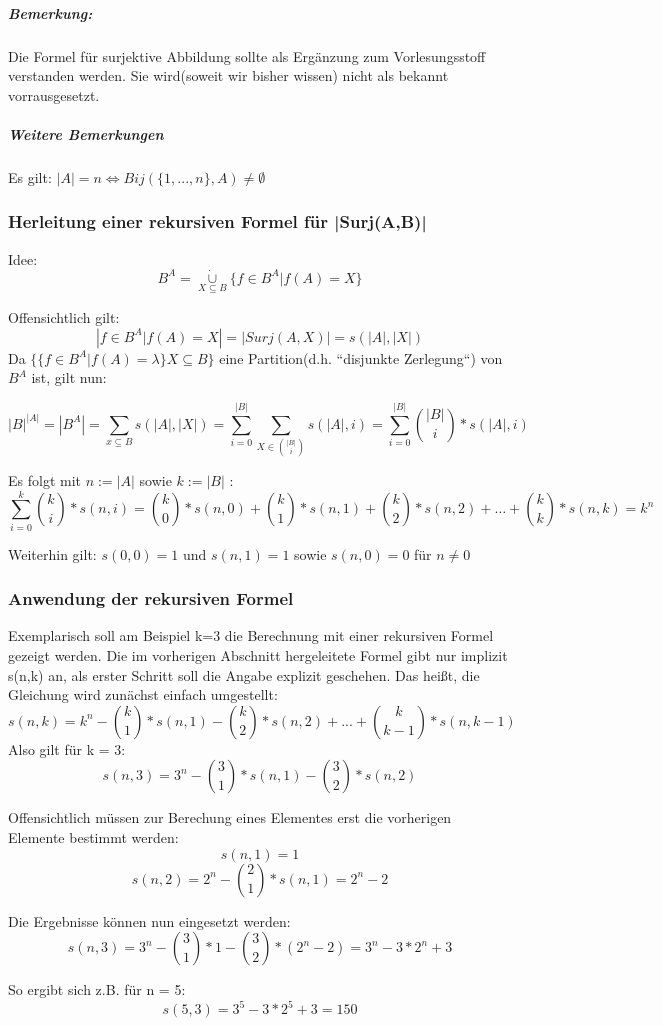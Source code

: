 \subparagraph*{Bemerkung:} Die Formel für surjektive Abbildung sollte als Ergänzung zum Vorlesungsstoff verstanden werden.
Sie wird(soweit wir bisher wissen) nicht als bekannt vorrausgesetzt.

\subparagraph{Weitere Bemerkungen}
Es gilt:
$ |A| = n \Longleftrightarrow Bij( \{1, ... , n\},A) \neq \emptyset$

\subsubsection{Herleitung einer rekursiven Formel für |Surj(A,B)| }
Idee: $$ B^A =  \underset {{X}\subseteq{B}} {\mathbin{\dot{\cup}}} {\{ f\in B^A | f(A) = X \}} $$

Offensichtlich gilt: $$ | {f \in B^A | f(A) = X} | = |Surj(A,X)| = s(|A|, |X|) $$
Da $ \{ \{f \in B^A | f(A) = \lambda \} X \subseteq B \} $ eine Partition(d.h. ``disjunkte Zerlegung``) von $B^A$ ist, gilt nun:

$$ {|B|}^{|A|} = |{B}^{A}| = \sum_{x \subseteq B} s(|A|,|X|)
= \sum_{i = 0}^{|B|} \sum_{X \in  {{|B|}\choose{i}} } s(|A|,i) =
\sum_{i = 0}^{|B|}   {{|B|}\choose{i}} *  s(|A|,i)
$$

Es folgt mit $n:=|A|$ sowie $k:=|B|$ :
$$ \sum_{i = 0}^{k}   {{k}\choose{i}} *  s(n,i)  =
{{k}\choose{0}} * s(n,0) + {{k}\choose{1}} * s(n,1) + {{k}\choose{2}} * s(n,2) + \dots + {{k}\choose{k}} * s(n,k) = k^n $$

Weiterhin gilt: $ s(0,0) = 1 $ und $s(n,1)=1$ sowie $ s(n,0)=0 $ für $ {n}\neq{0} $

\subsubsection{Anwendung der rekursiven Formel}
Exemplarisch soll am Beispiel k=3 die Berechnung mit einer rekursiven Formel gezeigt werden.
Die im vorherigen Abschnitt hergeleitete Formel gibt nur implizit s(n,k) an, als erster Schritt soll die Angabe explizit geschehen.
Das heißt, die Gleichung wird zunächst einfach umgestellt:
$$ s(n,k) = k^n - {{k}\choose{1}} * s(n,1) - {{k}\choose{2}} * s(n,2) + ... + {{k}\choose{k-1}} * s(n,k-1) $$
Also gilt für k = 3:
$$ s(n,3) = 3^n - {{3}\choose{1}} * s(n,1) - {{3}\choose{2}} * s(n,2) $$

Offensichtlich müssen zur Berechung eines Elementes erst die vorherigen Elemente bestimmt werden:
$$ s(n,1) = 1$$
$$ s(n,2) = 2^n - {{2}\choose{1}} * s(n,1) = 2^n -2 $$

Die Ergebnisse können nun eingesetzt werden:
$$ s(n,3) = 3^n - {{3}\choose{1}} * 1 - {{3}\choose{2}} * (2^n -2) = 3^n - 3 * 2^n + 3 $$

So ergibt sich z.B. für n = 5:
$$ s(5,3) = 3^5 - 3 * 2^5 + 3 = 150 $$
